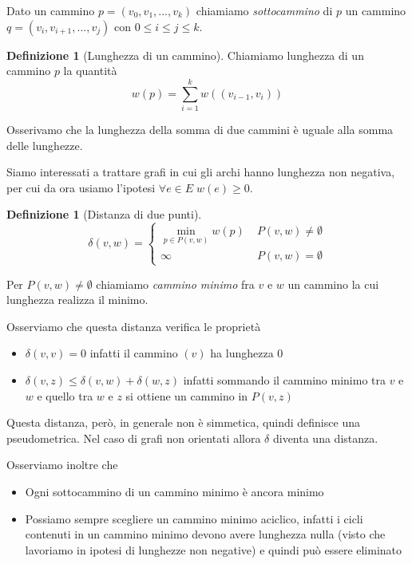 \documentclass[a4paper,10pt]{amsbook}
\newcounter{counter1}
\theoremstyle{plain}
\theoremstyle{definition}
\newtheorem{mydef}[counter1]{Definizione}
\theoremstyle{remark}
\newcommand{\pa}[1]{\left(#1\right)}
\begin{document}
Dato un cammino $p = ( v_0, v_1, ..., v_k)$ chiamiamo
\textit{sottocammino} di $p$ un cammino $q = ( v_i , v_{i+1}, ... ,
v_j )$ con $0 \le i \le j \le k$.

\begin{mydef}[Lunghezza di un cammino]
  Chiamiamo lunghezza di un cammino $p$ la quantità
  \[ w(p) = \sum _{i=1} ^k w \pa{ (v_{i-1}, v_i) } \]
\end{mydef}

Osserivamo che la lunghezza della somma di due cammini è uguale alla
somma delle lunghezze.

Siamo interessati a trattare grafi in cui gli archi hanno lunghezza
non negativa, per cui da ora usiamo l'ipotesi $\forall e \in E \; w(e)
\ge 0$.

\begin{mydef}[Distanza di due punti]
  \[ \delta(v,w) = \left\{
    \begin{matrix}
      \min \limits_{p \in P(v,w)} { w(p) } & \; P(v,w) \neq \emptyset \\
      \infty & \; P(v,w) = \emptyset
    \end{matrix}
    \right.
    \]
\end{mydef}

Per $P(v,w) \neq \emptyset$ chiamiamo \textit{cammino minimo} fra $v$
e $w$ un cammino la cui lunghezza realizza il minimo.

Osserviamo che questa distanza verifica le proprietà
\begin{itemize}
\item $\delta(v,v) = 0$ infatti il cammino $(v)$ ha lunghezza $0$
\item $\delta(v,z) \le \delta(v,w) + \delta(w,z)$ infatti sommando il
  cammino minimo tra $v$ e $w$ e quello tra $w$ e $z$ si ottiene un
  cammino in $P(v,z)$
\end{itemize}
Questa distanza, però, in generale non è simmetica, quindi definisce
una pseudometrica. Nel caso di grafi non orientati allora $\delta$
diventa una distanza.

Osserviamo inoltre che
\begin{itemize}
\item Ogni sottocammino di un cammino minimo è ancora minimo
\item Possiamo sempre scegliere un cammino minimo aciclico, infatti i
  cicli contenuti in un cammino minimo devono avere lunghezza nulla
  (visto che lavoriamo in ipotesi di lunghezze non negative) e quindi
  può essere eliminato
\end{itemize}
\end{document}
